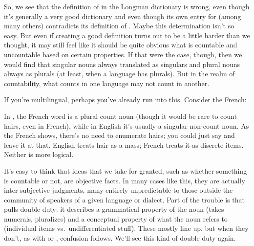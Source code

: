 So, we see that the definition of  in the Longman dictionary is wrong, even though it's generally a very good dictionary and even though its own entry for  (among many others) contradicts its definition of . Maybe this determination isn't so easy. But even if creating a good definition turns out to be a little harder than we thought, it may still feel like it should be quite obvious what is countable and uncountable based on certain properties. If that were the case, though, then we would find that singular nouns always translated as singulars and plural nouns always as plurals (at least, when a language has plurals). But in the realm of countability, what counts in one language may not count in another.

If you're multilingual, perhaps you've already run into this. Consider the French:

\label{ex:cheveaux}
\z
{}In , the French word  is a plural count noun (though it would be rare to count hairs, even in French), while in English it's usually a singular non-count noun. As the French shows, there's no need to enumerate hairs; you could just say  and leave it at that. English treats hair as a mass; French treats it as discrete items. Neither is more logical.

It's easy to think that ideas that we take for granted, such as whether something is countable or not, are objective facts. In many cases like this, they are actually inter-subjective judgments, many entirely unpredictable to those outside the community of speakers of a given language or dialect. Part of the trouble is that  pulls double duty: it describes a grammatical property of the noun (takes numerals, pluralizes) and a conceptual property of what the noun refers to (individual items vs.\ undifferentiated stuff). These mostly line up, but when they don't, as with  or , confusion follows. We'll see this kind of double duty again.

